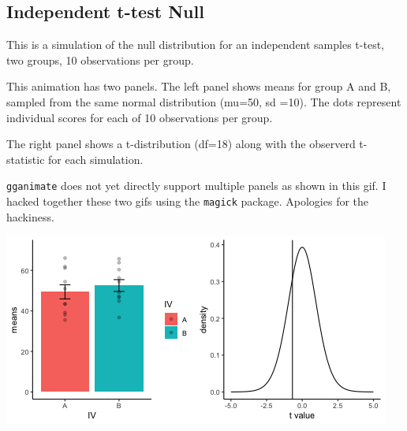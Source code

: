 \documentclass[]{book}
\begin{document}
\hypertarget{independent-t-test-null}{%
\subsection{Independent t-test Null}\label{independent-t-test-null}}

This is a simulation of the null distribution for an independent samples t-test, two groups, 10 observations per group.

This animation has two panels. The left panel shows means for group A and B, sampled from the same normal distribution (mu=50, sd =10). The dots represent individual scores for each of 10 observations per group.

The right panel shows a t-distribution (df=18) along with the observerd t-statistic for each simulation.

\texttt{gganimate} does not yet directly support multiple panels as shown in this gif. I hacked together these two gifs using the \texttt{magick} package. Apologies for the hackiness.

\includegraphics{gifs/indTtest.gif}
\end{document}
